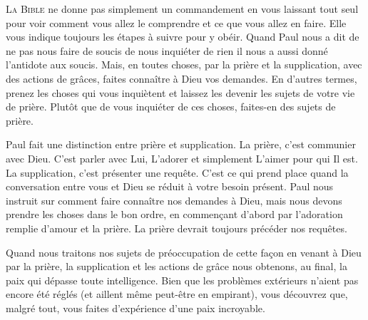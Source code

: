 \dvrule








\lettrine{L}{a Bible} ne donne pas simplement un commandement
 en vous laissant tout seul pour voir comment vous allez le comprendre
 et ce que vous allez en faire. Elle vous indique toujours les étapes
 à suivre pour y obéir. Quand Paul nous a dit de ne pas nous faire de soucis
 \ocadr de nous \Og inquiéter de rien \Fg{} \fcadr{}
 il nous a aussi donné l'antidote aux soucis.
 \Og Mais, en toutes choses, par la prière et la supplication,
 avec des actions de grâces, faites connaître à Dieu vos demandes. \Fg{}
 En d'autres termes, prenez les choses qui vous inquiètent
 et laissez les devenir les sujets de votre vie de prière.
 Plutôt que de vous inquiéter 
 de ces choses, faites-en des sujets de prière.


Paul fait une distinction entre prière et supplication.
 La prière, c'est communier avec Dieu. C'est parler avec Lui, L'adorer
 et simplement L'aimer pour qui Il est.
 La supplication, c'est présenter une requête.
 C'est ce qui prend place quand la conversation entre vous et Dieu se réduit
 à votre besoin présent. Paul nous instruit sur comment 
 faire connaître nos demandes à Dieu, mais nous devons prendre les choses
 dans le bon ordre, en commen\c{c}ant d'abord par l'adoration
 remplie d'amour et la prière.
 La prière devrait toujours précéder nos requêtes.

Quand nous traitons nos sujets de préoccupation
 de cette fa\c{c}on
 \ocadr en venant à Dieu par la prière, la supplication
 et les actions de grâce \fcadr{}
 nous obtenons, au final, la paix qui dépasse toute intelligence.
 Bien que les problèmes extérieurs n'aient pas encore été réglés
 (et aillent même peut-être en empirant), vous découvrez que, malgré tout,
 vous faites d'expérience d'une paix incroyable.

